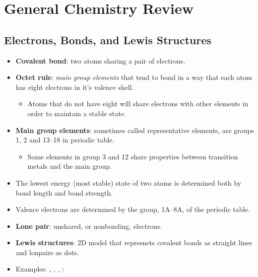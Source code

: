 \documentclass[12pt,a4paper]{article}
\begin{document}
\tableofcontents
\cleardoublepage
\fancyhead{}

\clearpage
{}
\clearpage
\section{General Chemistry Review}
\subsection{Electrons, Bonds, and Lewis Structures}
\begin{itemize}
    \item \textbf{Covalent bond}: two atoms sharing a pair of electrons.
    \item \textbf{Octet rule}: \textit{main group elements} that tend to bond in a way that each atom has {\color{o-Sun}eight} electrons in it's valence shell.
        \begin{itemize}
            \item Atoms that do not have eight will share electrons with other elements in order to maintain a stable state.
        \end{itemize}
    \item \textbf{Main group elements}: sometimes called representative elements, are groups 1, 2 and 13--18 in periodic table.
        \begin{itemize}
            \item Some elements in group 3 and 12 share properties between transition metals and the main group.
        \end{itemize}
    \item The lowest energy (most stable) state of two atoms is determined both by bond length and bond strength.
    \item Valence electrons are determined by the group, 1A--8A, of the periodic table.
    \item \textbf{Lone pair}: unshared, or nonbonding, electrons.
    \item \textbf{Lewis structures}: 2D model that represnets covalent bonds as straight lines and lonpairs as dots.
    \item Examples: , , , :

\end{itemize}
\end{document}
